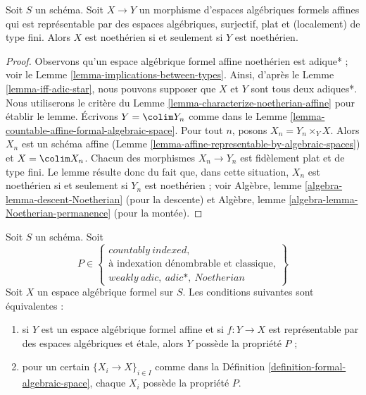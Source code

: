 \begin{lemma}
\label{lemma-iff-noetherian}
Soit $S$ un schéma. Soit $X \to Y$ un morphisme d'espaces algébriques
formels affines qui est représentable par des espaces algébriques,
surjectif, plat et (localement) de type fini. Alors $X$ est noethérien
si et seulement si $Y$ est noethérien.
\end{lemma}

\begin{proof}
Observons qu'un espace algébrique formel affine noethérien est adique* ; voir le
Lemme \ref{lemma-implications-between-types}. Ainsi, d'après le
Lemme \ref{lemma-iff-adic-star}, nous pouvons supposer que $X$ et $Y$
sont tous deux adiques*. Nous utiliserons le critère du
Lemme \ref{lemma-characterize-noetherian-affine}
pour établir le lemme. Écrivons $Y = \colim Y_n$
comme dans le Lemme \ref{lemma-countable-affine-formal-algebraic-space}.
Pour tout $n$, posons $X_n = Y_n \times_Y X$. Alors $X_n$ est un
schéma affine (Lemme \ref{lemma-affine-representable-by-algebraic-spaces})
et $X = \colim X_n$. Chacun des morphismes $X_n \to Y_n$ est
fidèlement plat et de type fini. Le lemme résulte donc du
fait que, dans cette situation, $X_n$ est noethérien si et seulement si $Y_n$
est noethérien ; voir
Algèbre, lemme \ref{algebra-lemma-descent-Noetherian} (pour la descente)
et
Algèbre, lemme \ref{algebra-lemma-Noetherian-permanence} (pour la montée).
\end{proof}

\begin{lemma}
\label{lemma-type-local}
Soit $S$ un schéma. Soit
$$
P \in
\left\{
\begin{matrix}
countably\ indexed,\\
\text{à indexation dénombrable et classique},\\
weakly\ adic,\ adic*,\ Noetherian
\end{matrix}
\right\}
$$
Soit $X$ un espace algébrique formel sur $S$.
Les conditions suivantes sont équivalentes :
\begin{enumerate}
\item si $Y$ est un espace algébrique formel affine et si
$f : Y \to X$ est représentable par des espaces algébriques et étale,
alors $Y$ possède la propriété $P$ ;
\item pour un certain $\{X_i \to X\}_{i \in I}$ comme dans la
Définition \ref{definition-formal-algebraic-space},
chaque $X_i$ possède la propriété $P$.
\end{enumerate}
\end{lemma}

